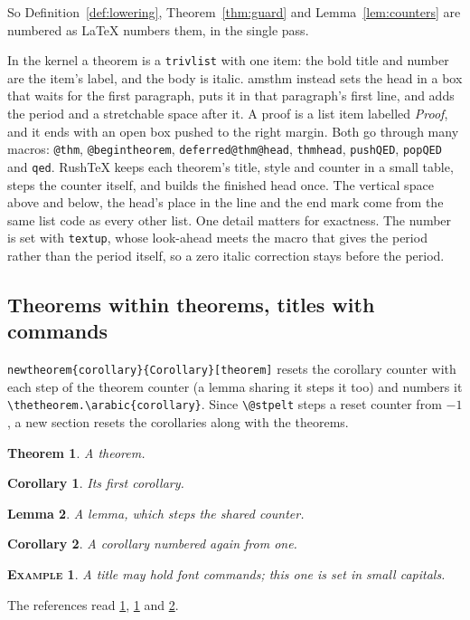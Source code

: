 \documentclass{article}
\numberwithin{equation}{section}
\newtheorem{theorem}{Theorem}[section]
\newtheorem{lemma}[theorem]{Lemma}
\newtheorem{corollary}{Corollary}[theorem]
\newtheorem{example}{\scshape Example}
\theoremstyle{definition}
\theoremstyle{remark}
\begin{document}
So Definition~\ref{def:lowering}, Theorem~\ref{thm:guard} and Lemma~\ref{lem:counters}
are numbered as \LaTeX{} numbers them, in the single pass.

In the kernel a theorem is a \texttt{trivlist} with one item: the bold title and number
are the item's label, and the body is italic. amsthm instead sets the head in a box that
waits for the first paragraph, puts it in that paragraph's first line, and adds the
period and a stretchable space after it. A proof is a list item labelled
\emph{Proof}, and it ends with an open box pushed to the right margin. Both go through
many macros: \texttt{@thm}, \texttt{@begintheorem}, \texttt{deferred@thm@head},
\texttt{thmhead}, \texttt{pushQED}, \texttt{popQED} and \texttt{qed}. RushTeX keeps each
theorem's title, style and counter in a small table, steps the counter itself, and
builds the finished head once. The vertical space above and below, the head's place in
the line and the end mark come from the same list code as every other list. One detail
matters for exactness. The number is set with \texttt{textup}, whose look-ahead meets
the macro that gives the period rather than the period itself, so a zero italic
correction stays before the period.

\subsection{Theorems within theorems, titles with commands}
\texttt{newtheorem\{corollary\}\{Corollary\}[theorem]} resets the corollary counter with
each step of the theorem counter (a lemma sharing it steps it too) and numbers it
\texttt{\textbackslash thetheorem.\textbackslash arabic\{corollary\}}. Since
\texttt{\textbackslash @stpelt} steps a reset counter from $-1$, a new section resets the
corollaries along with the theorems.
\begin{theorem}\label{thm:within}A theorem.\end{theorem}
\begin{corollary}\label{cor:first}Its first corollary.\end{corollary}
\begin{lemma}A lemma, which steps the shared counter.\end{lemma}
\begin{corollary}\label{cor:reset}A corollary numbered again from one.\end{corollary}
\begin{example}A title may hold font commands; this one is set in small capitals.\end{example}
The references read \ref{thm:within}, \ref{cor:first} and \ref{cor:reset}.
\end{document}
